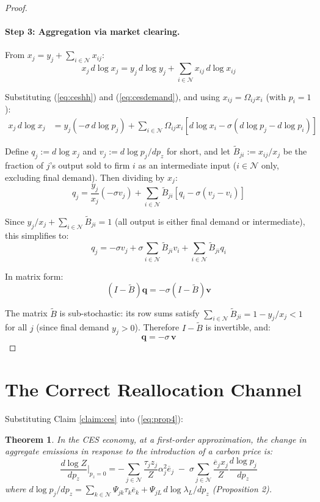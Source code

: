 \documentclass[11pt]{article}
\newtheorem{theorem}{Theorem}
\newcommand{\N}{\mathcal{N}}
\begin{document}
\begin{proof}
\paragraph{Step 3: Aggregation via market clearing.}
From $x_j = y_j + \sum_{i \in \N} x_{ij}$:
$$x_j\, d\log x_j = y_j\, d\log y_j + \sum_{i \in \N} x_{ij}\, d\log x_{ij}$$

Substituting (\ref{eq:ceshh}) and (\ref{eq:cesdemand}), and using $x_{ij} = \Omega_{ij} x_i$ (with $p_i = 1$):
\begin{align*}
    x_j\, d\log x_j &= y_j(-\sigma\, d\log p_j) + \sum_{i \in \N} \Omega_{ij} x_i [d\log x_i - \sigma(d\log p_j - d\log p_i)]
\end{align*}

Define $q_j := d\log x_j$ and $v_j := d\log p_j / dp_z$ for short, and let $\widetilde{B}_{ji} := x_{ij}/x_j$ be the fraction of $j$'s output sold to firm $i$ as an intermediate input ($i \in \N$ only, excluding final demand). Then dividing by $x_j$:
\begin{equation}
    \label{eq:system}
    q_j = \frac{y_j}{x_j}(-\sigma v_j) + \sum_{i \in \N} \widetilde{B}_{ji}[q_i - \sigma(v_j - v_i)]
\end{equation}

Since $y_j/x_j + \sum_{i \in \N} \widetilde{B}_{ji} = 1$ (all output is either final demand or intermediate), this simplifies to:
$$q_j = -\sigma v_j + \sigma \sum_{i \in \N}\widetilde{B}_{ji} v_i + \sum_{i \in \N}\widetilde{B}_{ji} q_i$$

In matrix form:
$$(I - \widetilde{B})\mathbf{q} = -\sigma(I - \widetilde{B})\mathbf{v}$$

The matrix $\widetilde{B}$ is sub-stochastic: its row sums satisfy $\sum_{i \in \N}\widetilde{B}_{ji} = 1 - y_j/x_j < 1$ for all $j$ (since final demand $y_j > 0$). Therefore $I - \widetilde{B}$ is invertible, and:
$$\mathbf{q} = -\sigma\, \mathbf{v}$$
\end{proof}

\section{The Correct Reallocation Channel}

Substituting Claim \ref{claim:ces} into (\ref{eq:prop4}):

\begin{theorem}
\label{thm:correct}
In the CES economy, at a first-order approximation, the change in aggregate emissions in response to the introduction of a carbon price is:
\begin{equation}
    \label{eq:correct_theorem}
    \frac{d\log Z}{dp_z}\bigg|_{p_z=0} = -\sum_{j \in \N} \frac{\tau_j z_j}{Z}\alpha_j^2 \overline{e}_j \;-\; \sigma \sum_{j \in \N} \frac{\overline{e}_j x_j}{Z}\frac{d\log p_j}{dp_z}
\end{equation}
where $d\log p_j / dp_z = \sum_{k \in \N}\Psi_{jk}\tau_k\overline{e}_k + \Psi_{jL}\, d\log \lambda_L / dp_z$ (Proposition 2).
\end{theorem}
\end{document}
